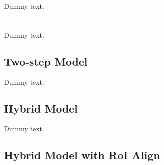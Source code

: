 Dummy text.

\section{\modelnameshort}\label{modmer}

Dummy text.

\subsection{Two-step Model}

Dummy text.

\subsection{Hybrid Model}

Dummy text.

\subsection{Hybrid Model with RoI Align}





